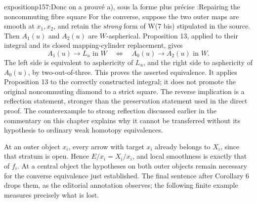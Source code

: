 \begin{dcomment}{exposition}{p157:Donc on a prouvé a), sous la forme plus précise :}{Repairing the noncommuting fibre square}
For the converse, suppose the two outer maps are smooth at $x_1,x_2$, and retain the \emph{strong} form of W(7 bis) stipulated in the source. Then $A_1(u)$ and $A_2(u)$ are $W$-aspherical. Proposition 13, applied to their integral and its closed mapping-cylinder replacement, gives
\[
 A_1(u)\longrightarrow L_u\text{ in }W
 \quad\Longleftrightarrow\quad
 A_0(u)\longrightarrow A_2(u)\text{ in }W.
\]
The left side is equivalent to asphericity of $L_u$, and the right side to asphericity of $A_0(u)$, by two-out-of-three. This proves the asserted equivalence. It applies Proposition 13 to the correctly constructed integral; it does not promote the original noncommuting diamond to a strict square. The reverse implication is a reflection statement, stronger than the preservation statement used in the direct proof. The counterexample to strong reflection discussed earlier in the commentary on this chapter explains why it cannot be transferred without its hypothesis to ordinary weak homotopy equivalences.

At an outer object $x_i$, every arrow with target $x_i$ already belongs to $X_i$, since that stratum is open. Hence $E/x_i=X_i/x_i$, and local smoothness is exactly that of $f_i$. At a central object the hypotheses on both outer objects remain necessary for the converse equivalence just established. The final sentence after Corollary 6 drops them, as the editorial annotation observes; the following finite example measures precisely what is lost.
\end{dcomment}

